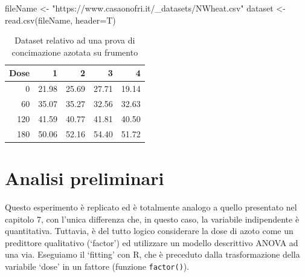\documentclass[a4paper,12pt,oneside]{book}
\newenvironment{Shaded}{\begin{snugshade}}{\end{snugshade}}
\newcommand{\StringTok}[1]{#1}
\newcommand{\OtherTok}[1]{#1}
\newcommand{\FunctionTok}[1]{#1}
\newcommand{\AttributeTok}[1]{#1}
\newcommand{\NormalTok}[1]{#1}
\begin{document}
\begin{Shaded}
\begin{Highlighting}[]
\NormalTok{fileName }\OtherTok{\textless{}{-}} \StringTok{"https://www.casaonofri.it/\_datasets/NWheat.csv"}
\NormalTok{dataset }\OtherTok{\textless{}{-}} \FunctionTok{read.csv}\NormalTok{(fileName, }\AttributeTok{header=}\NormalTok{T)}
\end{Highlighting}
\end{Shaded}

\begin{table}

\caption{\label{tab:tabName141}Dataset relativo ad una prova di concimazione azotata su frumento}
\centering
\begin{tabular}[t]{rrrrr}
\toprule
Dose & 1 & 2 & 3 & 4\\
\midrule
0 & 21.98 & 25.69 & 27.71 & 19.14\\
60 & 35.07 & 35.27 & 32.56 & 32.63\\
120 & 41.59 & 40.77 & 41.81 & 40.50\\
180 & 50.06 & 52.16 & 54.40 & 51.72\\
\bottomrule
\end{tabular}
\end{table}

\hypertarget{analisi-preliminari}{%
\section{Analisi preliminari}\label{analisi-preliminari}}

Questo esperimento è replicato ed è totalmente analogo a quello presentato nel capitolo 7, con l'unica differenza che, in questo caso, la variabile indipendente è quantitativa. Tuttavia, è del tutto logico considerare la dose di azoto come un predittore qualitativo (`factor') ed utilizzare un modello descrittivo ANOVA ad una via. Eseguiamo il `fitting' con R, che è preceduto dalla trasformazione della variabile `dose' in un fattore (funzione \texttt{factor()}).
\end{document}
